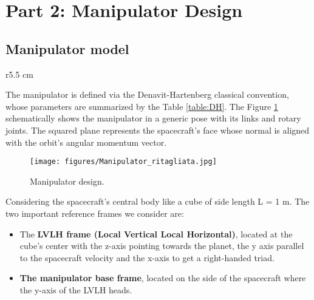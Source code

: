 

\section{Part 2: Manipulator Design}\label{sec:development}


\subsection{Manipulator model}

\begin{wraptable}{r}{5.5 cm}
    \caption{\label{table:DH} DH table.}
   
\end{wraptable}

The manipulator is defined via the Denavit-Hartenberg classical convention, whose parameters are summarized by the Table \ref{table:DH}. The Figure \ref{fig:manipulator} schematically shows the manipulator in a generic pose with its links and rotary joints. The squared plane represents the spacecraft’s face whose normal is aligned with the orbit’s angular momentum vector.


\begin{figure}[!ht]
    \centering
        \texttt{[image: figures/Manipulator\_ritagliata.jpg]}
        \caption{Manipulator design.}
        \label{fig:manipulator}
\end{figure}

Considering the spacecraft’s central body like a cube of side length L = 1 m. The two important reference frames we consider are:
\begin{itemize}
\item The \textbf{LVLH frame (Local Vertical Local Horizontal)}, located at the cube’s center with the z-axis pointing towards the planet, the y axis parallel to the spacecraft velocity and the x-axis to get a right-handed triad. 
\item \textbf{The manipulator base frame}, located on the side of the spacecraft where the y-axis of the LVLH heads. 
\end{itemize}


